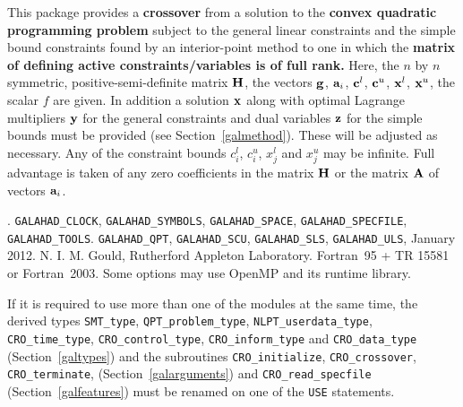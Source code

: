 \documentclass{galahad}
\newcommand{\packagename}{CRO}
\newcommand{\fullpackagename}{\libraryname\_\packagename}
\begin{document}
\galheader


\galsummary
This package provides a {\bf crossover} from a solution
to the {\bf convex quadratic programming problem}
subject to the general linear constraints
and the simple bound constraints
found by an interior-point method to one in which the
{\bf matrix of defining
active constraints/variables is of full rank.}
Here, the $n$ by $n$ symmetric, positive-semi-definite matrix ${\mathbf{H}}$, the
vectors ${\mathbf{g}}$, ${\mathbf{a}}_{i}$, ${\mathbf{c}}^{l}$, ${\mathbf{c}}^{u}$, ${\mathbf{x}}^{l}$,
${\mathbf{x}}^{u}$, the scalar $f$ are given. In addition a solution ${\mathbf{x}}$ along
with optimal Lagrange multipliers ${\mathbf{y}}$ for the general constraints
and dual variables ${\mathbf{z}}$ for the simple bounds must be provided
(see Section~\ref{galmethod}).
These will be adjusted as necessary.
Any of the constraint bounds $c_{i}^{l}$, $c_{i}^{u}$,
$x_{j}^{l}$ and $x_{j}^{u}$ may be infinite.
Full advantage is taken of any zero coefficients in the matrix ${\mathbf{H}}$
or the matrix ${\mathbf{A}}$ of vectors ${\mathbf{a}}_{i}$.


\galattributes
\galversions{\tt  \fullpackagename\_single, \fullpackagename\_double}.
\galuses
{\tt GALAHAD\_CLOCK},
{\tt GALAHAD\_SY\-M\-BOLS},
{\tt GALAHAD\-\_SPACE},
{\tt GALAHAD\_\-SPECFILE},
{\tt GALAHAD\_TOOLS}.
{\tt GALAHAD\_QPT},
{\tt GALAHAD\_\-SCU},
{\tt GALAHAD\_\-SLS},
{\tt GALAHAD\_\-ULS},
\galdate January 2012.
\galorigin N. I. M. Gould, Rutherford Appleton Laboratory.
\gallanguage Fortran~95 + TR 15581 or Fortran~2003.
\galparallelism Some options may use OpenMP and its runtime library.


\galhowto




\noindent
If it is required to use more than one of the modules at the same time, 
the derived types
{\tt SMT\_type},
{\tt QPT\_problem\_type},
{\tt NLPT\_user\-data\-\_type},
{\tt \packagename\_time\_type},
{\tt \packagename\_control\_type},
{\tt \packagename\_inform\_type}
and
{\tt \packagename\_data\_type}
(Section~\ref{galtypes})
and the subroutines
{\tt \packagename\_initialize},
{\tt \packagename\_\-crossover},
{\tt \packagename\_terminate},
(Section~\ref{galarguments})
and
{\tt \packagename\_read\_specfile}
(Section~\ref{galfeatures})
must be renamed on one of the {\tt USE} statements.
\end{document}
